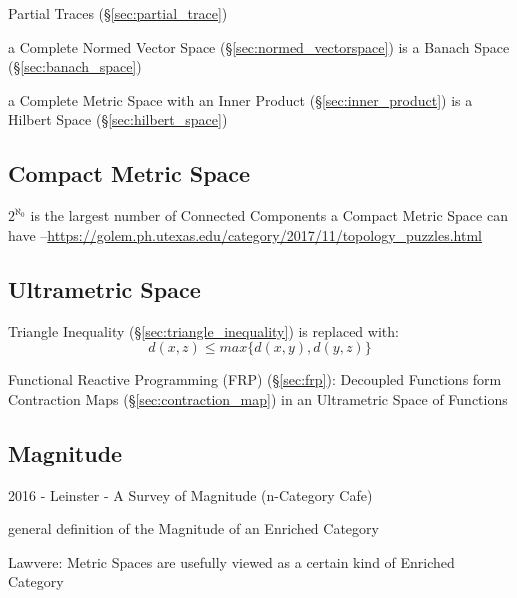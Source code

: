 Partial Traces (\S\ref{sec:partial_trace})

a Complete Normed Vector Space (\S\ref{sec:normed_vectorspace}) is a Banach
Space (\S\ref{sec:banach_space})

a Complete Metric Space with an Inner Product (\S\ref{sec:inner_product}) is a
Hilbert Space (\S\ref{sec:hilbert_space})



\subsection{Compact Metric Space}\label{sec:compact_metric_space}

$2^{\aleph_0}$ is the largest number of Connected Components a Compact Metric
Space can have
--\url{https://golem.ph.utexas.edu/category/2017/11/topology_puzzles.html}



\subsection{Ultrametric Space}\label{sec:ultrametric_space}

Triangle Inequality (\S\ref{sec:triangle_inequality}) is replaced
with:
\[
  d(x,z) \leq max\{d(x,y),d(y,z)\}
\]

Functional Reactive Programming (FRP) (\S\ref{sec:frp}): Decoupled
Functions form Contraction Maps (\S\ref{sec:contraction_map}) in an
Ultrametric Space of Functions



\subsection{Magnitude}\label{sec:magnitude}

2016 - Leinster - A Survey of Magnitude (n-Category Cafe) %

general definition of the Magnitude of an Enriched Category %

Lawvere: Metric Spaces are usefully viewed as a certain kind of
Enriched Category

